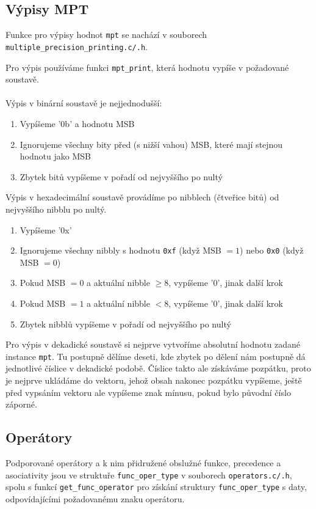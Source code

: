 \subsection{Výpisy MPT}
Funkce pro výpisy hodnot \verb|mpt| se nachází v souborech \\ \verb|multiple_precision_printing.c/.h|.

Pro výpis používáme funkci \verb|mpt_print|, která hodnotu vypíše v požadované soustavě.
\\\\
Výpis v binární soustavě je nejjednodušší:
\begin{enumerate}
    \item Vypíšeme '0b' a hodnotu MSB
    \item Ignorujeme všechny bity před (s nižší vahou) MSB, které mají stejnou hodnotu jako MSB
    \item Zbytek bitů vypíšeme v pořadí od nejvyššího po nultý
\end{enumerate} 

Výpis v hexadecimální soustavě provádíme po nibblech (čtveřice bitů) od nejvyššího nibblu po nultý.
\begin{enumerate}
    \item Vypíšeme '0x'
    \item Ignorujeme všechny nibbly s hodnotu \verb|0xf| (když MSB $ = 1$) nebo \verb|0x0| (když MSB $ = 0$)
    \item Pokud MSB $ = 0$ a aktuální nibble $\geq 8$, vypíšeme '0', jinak další krok
    \item Pokud MSB $ = 1$ a aktuální nibble $<8$, vypíšeme '0', jinak další krok
    \item Zbytek nibblů vypíšeme v pořadí od nejvyššího po nultý
\end{enumerate}

Pro výpis v dekadické soustavě si nejprve vytvoříme absolutní hodnotu zadané instance \verb|mpt|. Tu postupně dělíme deseti, kde zbytek po dělení nám postupně dá jednotlivé číslice v dekadické podobě. Číslice takto ale získáváme pozpátku, proto je nejprve ukládáme do vektoru, jehož obsah nakonec pozpátku vypíšeme, ještě před vypsáním vektoru ale vypíšeme znak mínusu, pokud bylo původní číslo záporné.

\subsection{Operátory}
Podporované operátory a k nim přidružené obslužné funkce, precedence a asociativity jsou ve struktuře \verb|func_oper_type| v souborech \verb|operators.c/.h|, spolu s funkcí \verb|get_func_operator| pro získání struktury \verb|func_oper_type| s daty, odpovídajícími požadovanému znaku operátoru.
\newpage


